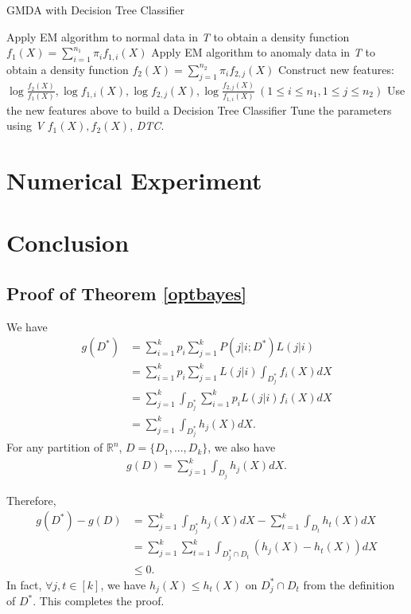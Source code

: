 \documentclass[english]{article}
\newenvironment{eqt}{\begin{equation}\begin{aligned}}{\end{aligned}\end{equation}}
\begin{document}
\begin{algorithm}[H]
\label{GMDA-DTC}
\caption{GMDA with Decision Tree Classifier}
\SetAlgoLined
		Apply EM algorithm to normal data in \textit{T} to obtain a density function $f_1(X) = \sum_{i=1}^{n_1}\pi_if_{1, i}(X)$\;
		Apply EM algorithm to anomaly data in \textit{T} to obtain a density function $f_2(X) = \sum_{j=1}^{n_2}\pi_if_{2, j}(X)$\;
		Construct new features:\ $\log \frac{f_2(X)}{f_1(X)}, \log f_{1, i}(X), \log f_{2, j}(X), \log \frac{f_{2, j}(X)}{f_{1, i}(X)}\ (1\leqslant i\leqslant n_1, 1\leqslant j\leqslant n_2)$\;
		Use the new features above to build a Decision Tree Classifier\;
		Tune the parameters using \textit{V}\;
		\Return $f_1(X), f_2(X)$, \textit{DTC}.
\end{algorithm}


\section{Numerical Experiment}

\section{Conclusion}





\newpage
\begin{appendix}
\section{Proof of Theorem \ref{optbayes}}
\par

We have
\begin{eqt}
g(D^*) & = \sum_{i=1}^kp_i\sum_{j=1}^kP(j|i;D^*)L(j|i) \\
& = \sum_{i=1}^kp_i\sum_{j=1}^kL(j|i)\int_{D_j^*}f_i(X)dX \\
& = \sum_{j=1}^k\int_{D_j^*}\sum_{i=1}^kp_iL(j|i)f_i(X)dX \\
& = \sum_{j=1}^k\int_{D_j^*}h_j(X)dX.
\end{eqt}
For any partition of $\mathbb{R}^n$, $D = \{D_1, ..., D_k\}$, we also have
\begin{eqt}
g(D) = \sum_{j=1}^k\int_{D_j}h_j(X)dX.
\end{eqt}

Therefore, 
\begin{eqt}
g(D^*) - g(D) & = \sum_{j=1}^k\int_{D_j^*}h_j(X)dX - \sum_{t=1}^k\int_{D_t}h_t(X)dX \\
& = \sum_{j=1}^k\sum_{t=1}^k\int_{D_j^*\cap D_t}\left(h_j(X)-h_t(X)\right)dX \\
& \leqslant 0.
\end{eqt}
In fact, $\forall j, t\in[k]$, we have $h_j(X)\leqslant h_t(X)$ on $D_j^*\cap D_t$ from the definition of $D^*$. This completes the proof.
\end{appendix}
\end{document}
